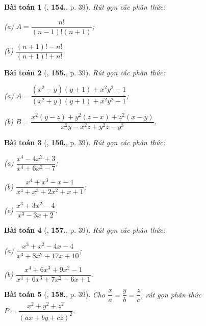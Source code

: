 \documentclass{article}
\numberwithin{equation}{section}
\newtheorem{baitoan}{Bài toán}
\begin{document}
\begin{baitoan}[\cite{Tuyen_Toan_8}, \textbf{154.}, p. 39]
	Rút gọn các phân thức:
	\begin{enumerate*}
		\item[(a)] $A = \dfrac{n!}{(n - 1)!(n + 1)}$;
		\item[(b)] $\dfrac{(n + 1)! - n!}{(n + 1)! + n!}$.
	\end{enumerate*}
\end{baitoan}

\begin{baitoan}[\cite{Tuyen_Toan_8}, \textbf{155.}, p. 39]
	Rút gọn các phân thức:
	
	\begin{enumerate*}
		\item[(a)] $A = \dfrac{(x^2 - y)(y + 1) + x^2y^2 - 1}{(x^2 + y)(y + 1) + x^2y^2 + 1}$;
		\item[(b)] $B = \dfrac{x^2(y - z) + y^2(z - x) + z^2(x - y)}{x^2y - x^2z + y^2z - y^3}$.
	\end{enumerate*}
\end{baitoan}

\begin{baitoan}[\cite{Tuyen_Toan_8}, \textbf{156.}, p. 39]
	Rút gọn các phân thức:
	\begin{enumerate*}
		\item[(a)] $\dfrac{x^4 - 4x^2 + 3}{x^4 + 6x^2 - 7}$;
		\item[(b)] $\dfrac{x^4 + x^3 - x - 1}{x^4 + x^3 + 2x^2 + x + 1}$;
		\item[(c)] $\dfrac{x^3 + 3x^2 - 4}{x^3 - 3x + 2}$.
	\end{enumerate*}
\end{baitoan}

\begin{baitoan}[\cite{Tuyen_Toan_8}, \textbf{157.}, p. 39]
	Rút gọn các phân thức:
	\begin{enumerate*}
		\item[(a)] $\dfrac{x^3 + x^2 - 4x - 4}{x^3 + 8x^2 + 17x + 10}$;
		\item[(b)] $\dfrac{x^4 + 6x^3 + 9x^2 - 1}{x^4 + 6x^3 + 7x^2 - 6x + 1}$.
	\end{enumerate*}
\end{baitoan}

\begin{baitoan}[\cite{Tuyen_Toan_8}, \textbf{158.}, p. 39]
	Cho $\dfrac{x}{a} = \dfrac{y}{b} = \dfrac{z}{c}$, rút gọn phân thức $P = \dfrac{x^2 + y^2 + z^2}{(ax + by + cz)^2}$.
\end{baitoan}
\end{document}
